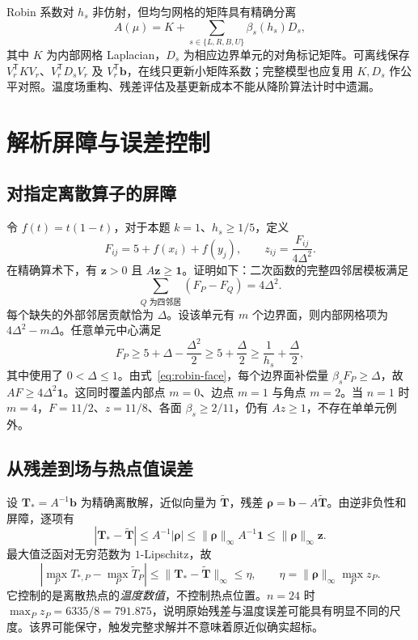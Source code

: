 Robin 系数对 $h_s$ 非仿射，但均匀网格的矩阵具有精确分离
\begin{equation}
 A(\mu)=K+\sum_{s\in\{L,R,B,U\}}\beta_s(h_s)D_s,
 \label{eq:affine-beta}
\end{equation}
其中 $K$ 为内部网格 Laplacian，$D_s$ 为相应边界单元的对角标记矩阵。可离线保存 $V_r^{\mathsf T}KV_r$、$V_r^{\mathsf T}D_sV_r$ 及 $V_r^{\mathsf T}\boldsymbol b$，在线只更新小矩阵系数；完整模型也应复用 $K,D_s$ 作公平对照。温度场重构、残差评估及基更新成本不能从降阶算法计时中遗漏。

\section{解析屏障与误差控制}
\subsection{对指定离散算子的屏障}
令 $f(t)=t(1-t)$，对于本题 $k=1$、$h_s\ge1/5$，定义
\begin{equation}
 F_{ij}=5+f(x_i)+f(y_j),\qquad
 z_{ij}=\frac{F_{ij}}{4\Delta^2}.
 \label{eq:barrier}
\end{equation}
在精确算术下，有 $\boldsymbol z>0$ 且 $A\boldsymbol z\ge\boldsymbol1$。证明如下：二次函数的完整四邻居模板满足
\[
 \sum_{Q\text{ 为四邻居}}(F_P-F_Q)=4\Delta^2.
\]
每个缺失的外部邻居贡献恰为 $\Delta$。设该单元有 $m$ 个边界面，则内部网格项为 $4\Delta^2-m\Delta$。任意单元中心满足
\[
 F_P\ge5+\Delta-\frac{\Delta^2}{2}
      \ge5+\frac\Delta2
      \ge\frac1{h_s}+\frac\Delta2,
\]
其中使用了 $0<\Delta\le1$。由式~\eqref{eq:robin-face}，每个边界面补偿量 $\beta_sF_P\ge\Delta$，故 $AF\ge4\Delta^2\boldsymbol1$。这同时覆盖内部点 $m=0$、边点 $m=1$ 与角点 $m=2$。当 $n=1$ 时 $m=4$，$F=11/2$、$z=11/8$、各面 $\beta_s\ge2/11$，仍有 $Az\ge1$，不存在单单元例外。

\subsection{从残差到场与热点值误差}
设 $\boldsymbol T_*=A^{-1}\boldsymbol b$ 为精确离散解，近似向量为 $\widetilde{\boldsymbol T}$，残差 $\boldsymbol\rho=\boldsymbol b-A\widetilde{\boldsymbol T}$。由逆非负性和屏障，逐项有
\begin{equation}
 |\boldsymbol T_*-\widetilde{\boldsymbol T}|
 \le A^{-1}|\boldsymbol\rho|
 \le\|\boldsymbol\rho\|_\infty A^{-1}\boldsymbol1
 \le\|\boldsymbol\rho\|_\infty\boldsymbol z.
 \label{eq:component-bound}
\end{equation}
最大值泛函对无穷范数为 $1$-Lipschitz，故
\begin{equation}
 \left|\max_P T_{*,P}-\max_P\widetilde T_P\right|
 \le\|\boldsymbol T_*-\widetilde{\boldsymbol T}\|_\infty
 \le\eta,\qquad
 \eta=\|\boldsymbol\rho\|_\infty\max_Pz_P.
 \label{eq:eta}
\end{equation}
它控制的是离散热点的\emph{温度数值}，不控制热点位置。$n=24$ 时 $\max_Pz_P=6335/8=791.875$，说明原始残差与温度误差可能具有明显不同的尺度。该界可能保守，触发完整求解并不意味着原近似确实超标。

